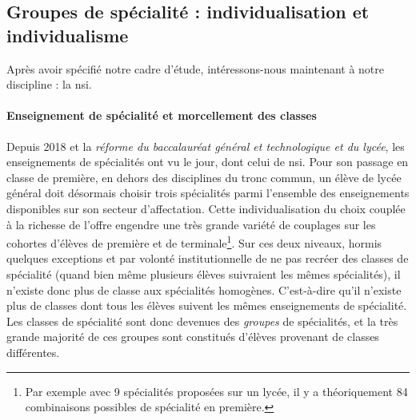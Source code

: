 \subsection{Groupes de spécialité : individualisation et individualisme}


Après avoir spécifié notre cadre d'étude, intéressons-nous maintenant à notre discipline : la \gls{nsi}.
\paragraph{Enseignement de spécialité et morcellement des classes}
%
%
Depuis 2018 et la \emph{réforme du baccalauréat général et technologique et du lycée}, les enseignements de spécialités ont vu le jour, dont celui de \gls{nsi}. Pour son passage en classe de première, en dehors des disciplines du tronc commun, un élève de lycée général doit désormais choisir trois spécialités parmi l'ensemble des enseignements disponibles sur son secteur d'affectation. Cette individualisation du choix couplée à la richesse de l'offre engendre une très grande variété de couplages sur les cohortes d'élèves de première et de terminale\footnote{Par exemple avec 9 spécialités proposées sur un lycée, il y a théoriquement 84 combinaisons possibles de spécialité en première.}. Sur ces deux niveaux, hormis quelques exceptions et par volonté institutionnelle de ne pas recréer des classes de spécialité (quand bien même plusieurs élèves suivraient les mêmes spécialités), il n'existe donc plus de classe aux spécialités homogènes. C'est-à-dire qu'il n'existe plus de classes dont tous les élèves suivent les mêmes enseignements de spécialité. Les classes de spécialité sont donc devenues des \emph{groupes} de spécialités, et la très grande majorité de ces groupes sont constitués d'élèves provenant de classes différentes.



